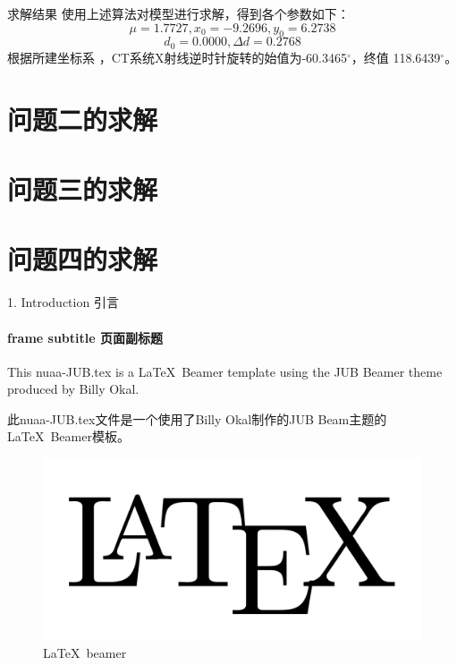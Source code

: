 \documentclass{beamer}
\begin{document}
  \begin{frame}{求解结果} 
    使用上述算法对模型进行求解，得到各个参数如下：
    \[\mu = 1.7727,x_0 = -9.2696,y_0 = 6.2738\]
    \[d_0 = 0.0000,\Delta d = 0.2768\]
    根据所建坐标系 ，CT系统X射线逆时针旋转的始值为-60.3465$^\circ$，终值 118.6439$^\circ$。
  \end{frame}
  
  \section{问题二的求解}
  \section{问题三的求解}
  \section{问题四的求解}
  \begin{frame}{1. Introduction 引言}
    \framesubtitle{frame subtitle 页面副标题}
    This nuaa-JUB.tex is a \LaTeX \ Beamer template using the JUB Beamer theme  produced by Billy Okal.

    \bigskip

    此nuaa-JUB.tex文件是一个使用了Billy Okal制作的JUB Beam主题的\LaTeX \ Beamer模板。

    \begin{figure}
      \begin{center}
        \includegraphics[scale=0.1]{latex.png}
      \end{center}
      \caption{\LaTeX \ beamer}
      \label{Fig:latex_beamer}
    \end{figure}
  \end{frame} %
\end{document}
